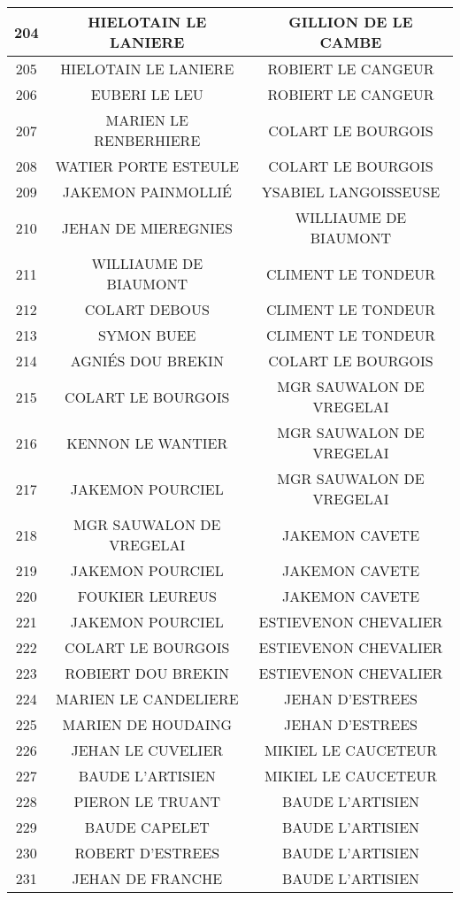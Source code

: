\begin{center}
\begin{longtable}{|c|c|c|}
\hline	204	&	HIELOTAIN LE LANIERE	&	GILLION DE LE CAMBE	\\
\hline	205	&	HIELOTAIN LE LANIERE	&	ROBIERT LE CANGEUR	\\
\hline	206	&	EUBERI LE LEU	&	ROBIERT LE CANGEUR	\\
\hline	207	&	MARIEN LE RENBERHIERE	&	COLART LE BOURGOIS	\\
\hline	208	&	WATIER PORTE ESTEULE	&	COLART LE BOURGOIS	\\
\hline	209	&	JAKEMON PAINMOLLIÉ	&	YSABIEL LANGOISSEUSE	\\
\hline	210	&	JEHAN DE MIEREGNIES	&	WILLIAUME DE BIAUMONT	\\
\hline	211	&	WILLIAUME DE BIAUMONT	&	CLIMENT LE TONDEUR	\\
\hline	212	&	COLART DEBOUS	&	CLIMENT LE TONDEUR	\\
\hline	213	&	SYMON BUEE	&	CLIMENT LE TONDEUR	\\
\hline	214	&	AGNIÉS DOU BREKIN	&	COLART LE BOURGOIS	\\
\hline	215	&	COLART LE BOURGOIS	&	MGR SAUWALON DE VREGELAI	\\
\hline	216	&	KENNON LE WANTIER	&	MGR SAUWALON DE VREGELAI	\\
\hline	217	&	JAKEMON POURCIEL	&	MGR SAUWALON DE VREGELAI	\\
\hline	218	&	MGR SAUWALON DE VREGELAI	&	JAKEMON CAVETE	\\
\hline	219	&	JAKEMON POURCIEL	&	JAKEMON CAVETE	\\
\hline	220	&	FOUKIER LEUREUS	&	JAKEMON CAVETE	\\
\hline	221	&	JAKEMON POURCIEL	&	ESTIEVENON CHEVALIER	\\
\hline	222	&	COLART LE BOURGOIS	&	ESTIEVENON CHEVALIER	\\
\hline	223	&	ROBIERT DOU BREKIN	&	ESTIEVENON CHEVALIER	\\
\hline	224	&	MARIEN LE CANDELIERE	&	JEHAN D'ESTREES	\\
\hline	225	&	MARIEN DE HOUDAING	&	JEHAN D'ESTREES	\\
\hline	226	&	JEHAN LE CUVELIER	&	MIKIEL LE CAUCETEUR	\\
\hline	227	&	BAUDE L'ARTISIEN	&	MIKIEL LE CAUCETEUR	\\
\hline	228	&	PIERON LE TRUANT	&	BAUDE L'ARTISIEN	\\
\hline	229	&	BAUDE CAPELET	&	BAUDE L'ARTISIEN	\\
\hline	230	&	ROBERT D'ESTREES	&	BAUDE L'ARTISIEN	\\
\hline	231	&	JEHAN DE FRANCHE	&	BAUDE L'ARTISIEN	\\

\end{longtable}
\end{center}
